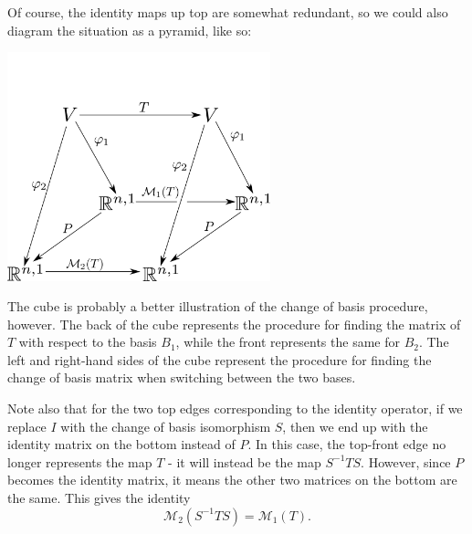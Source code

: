 \documentclass[12pt,letterpaper]{article}
\newcommand{\M}{\mathcal{M}}
\begin{document}
Of course, the identity maps up top are somewhat redundant, so we could also diagram the situation as a pyramid, like so:
\begin{center}
 \includegraphics[width=3in]{basis_pyramid.pdf}
\end{center}
The cube is probably a better illustration of the change of basis procedure, however. The back of the cube represents the procedure for finding the matrix of $T$ with respect to the basis $B_1$, while the front represents the same for $B_2$. The left and right-hand sides of the cube represent the procedure for finding the change of basis matrix when switching between the two bases. 

Note also that for the two top edges corresponding to the identity operator, if we replace $I$ with the change of basis isomorphism $S$, then we end up with the identity matrix on the bottom instead of $P$. In this case, the top-front edge no longer represents the map $T$ - it will instead be the map $S^{-1}TS$. However, since $P$ becomes the identity matrix, it means the other two matrices on the bottom are the same. This gives the identity
\[
 \M_2(S^{-1}TS) = \M_1(T).
\]
\end{document}
